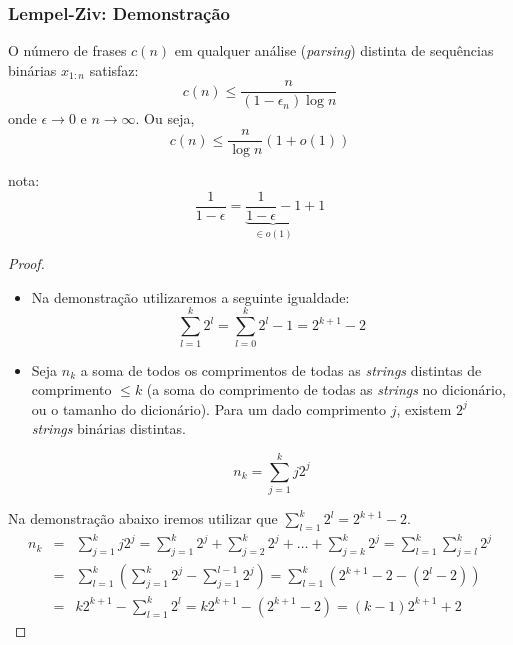 \begin{frame}[allowframebreaks]
  \frametitle{Lempel-Ziv: Demonstração}

  \begin{lemma}
  O número de frases $c(n)$ em qualquer análise (\textit{parsing}) distinta de sequências
  binárias $x_{1:n}$ satisfaz:
	\begin{equation}
	c(n) \leq \frac{n}{(1-\epsilon_n) \log n}
	\end{equation}
  onde $\epsilon \rightarrow 0$ e $n \rightarrow \infty$. Ou seja,
	\begin{equation}
	c(n) \leq \frac{n}{\log n} (1 + o(1))
	\end{equation}

  nota: 
	\begin{equation}
	\frac{1}{1 - \epsilon} = \underbrace{ \frac{1}{1 - \epsilon} - 1 }_{\in o(1)} + 1
	\end{equation}
  \end{lemma}

  \begin{proof}
	\begin{itemize}
	\item Na demonstração utilizaremos a seguinte igualdade:
		\begin{equation}
		\sum_{l=1}^k 2^l = \sum_{l=0}^k 2^l - 1 = 2^{k+1} - 2
		\end{equation}
	\item Seja $n_k$ a soma de todos os comprimentos de todas as \textit{strings} distintas
		de comprimento $\leq k$ (a soma do comprimento de todas as \textit{strings} no
		dicionário, ou o tamanho do dicionário). 
		Para um dado comprimento $j$, existem $2^j$ \textit{strings} binárias distintas.

		\begin{equation}
		n_k = \sum_{j=1}^k j 2^j
		\end{equation}

	\end{itemize}
	\proofbreak

	Na demonstração abaixo iremos utilizar que $\sum_{l=1}^k 2^l = 2^{k+1} - 2$.
	\begin{eqnarray}
	n_k &=& \sum_{j=1}^k j 2^j = \sum_{j=1}^k 2^j + \sum_{j=2}^k 2^j + \ldots + \sum_{j=k}^k 2^j = \sum_{l=1}^k \sum_{j=l}^k 2^j \nonumber \\
	&=& \sum_{l=1}^k \left( \sum_{j=1}^k 2^j  - \sum_{j=1}^{l-1} 2^j \right) = \sum_{l=1}^k \left( 2^{k+1} - 2 - ( 2^{l} - 2 ) \right) \nonumber \\
	&=& k 2^{k+1} - \sum_{l=1}^k 2^{l} = k 2^{k+1} - (2^{k+1} - 2) = (k-1) 2^{k+1} + 2 
	\end{eqnarray}


\end{proof}
\end{frame}
